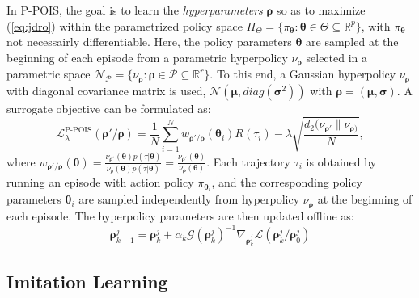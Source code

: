 In P-POIS, the goal is to learn the \textit{hyperparameters} \(\boldsymbol \rho\) so as to maximize (\ref{eq:jdro}) within the parametrized policy space $\Pi_\Theta=\{\pi_{\boldsymbol \theta}:\boldsymbol \theta \in \Theta \subseteq \mathbb{R}^p\}$, with $\pi_{\boldsymbol \theta}$ not necessairly differentiable. Here, the policy parameters $\boldsymbol \theta$ are sampled at the beginning of each episode from a parametric hyperpolicy $\nu_{\boldsymbol \rho}$ selected in a parametric space \(\mathcal{N}_{\mathcal{P}} = \{\nu_{\boldsymbol \rho}:\boldsymbol \rho \in \mathcal{P} \subseteq \mathbb{R}^r\}\).
To this end, a Gaussian hyperpolicy $\nu_{\boldsymbol \rho}$ with diagonal covariance matrix is used, $\mathcal{N}(\boldsymbol \mu,diag(\boldsymbol \sigma^2))$ with $\boldsymbol \rho=(\boldsymbol \mu,\boldsymbol \sigma)$.
A surrogate objective can be formulated as: \begin{equation}\mathcal{L}_\lambda^{\text{P-POIS}}(\boldsymbol \rho'/\boldsymbol \rho)=\frac{1}{N} \sum^N_{i=1}w_{\boldsymbol \rho'/ \boldsymbol\rho}(\boldsymbol \theta_i)R(\tau_i)-\lambda\sqrt{\frac{d_2(\nu_{\boldsymbol \rho'}\|\nu_{\boldsymbol \rho)}}{N}},\end{equation} where \(w_{\boldsymbol \rho'/\boldsymbol \rho}(\boldsymbol \theta)=\frac{\nu_{\boldsymbol\rho'}(\boldsymbol\theta)p(\tau|\boldsymbol \theta)}{\nu_\rho(\boldsymbol\theta)p(\tau|\boldsymbol \theta)}=\frac{\nu_{\boldsymbol\rho'}(\boldsymbol\theta)}{\nu_{\boldsymbol \rho}(\boldsymbol\theta)}.\)
Each trajectory $\tau_i$ is obtained by running an episode with action policy $\pi_{\boldsymbol \theta_i}$, and the corresponding policy parameters $\boldsymbol \theta_i$ are sampled independently from hyperpolicy $\nu_{\boldsymbol \rho}$ at the beginning of each episode. The hyperpolicy parameters are then updated offline as: \begin{equation}\boldsymbol \rho^j_{k+1}=\boldsymbol \rho^j_k+\alpha_k\mathcal{G}(\boldsymbol \rho_k^j)^{-1}\nabla_{\boldsymbol \rho_k^j}\mathcal{L}(\boldsymbol\rho^j_k/\boldsymbol \rho^j_0)\end{equation}

\subsection{Imitation Learning}


